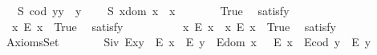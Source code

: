 \begin{isabellebody}
\ \ \ S{}{\isacharcolon}\ {\isachardoublequoteopen}{\isacharparenleft}cod\ y{\isacharparenright}{\isasymcdot}y\ {\isasymcong}\ y{\isachardoublequoteclose}\ \isanewline
\ \ \ S{}{\isacharcolon}\ {\isachardoublequoteopen}x{\isasymcdot}{\isacharparenleft}dom\ x{\isacharparenright}\ {\isasymcong}\ x{\isachardoublequoteclose}\isanewline
\ \ \isanewline
\ \ \ \isamarkupfalse%
\ True\ \isamarkupfalse%
\ {\isacharbrackleft}satisfy{\isacharbrackright}%
\isadelimproof
\ %
\endisadelimproof
%
\isatagproof
{}\isamarkupfalse%
\ \ %
%
\endisatagproof
{\isafoldproof}%
%
\isadelimproof
%
\endisadelimproof
\isanewline
\ \ \ \isamarkupfalse%
\ \ {\isachardoublequoteopen}{\isasymexists}x{\isachardot}\ \isactrlbold {\isasymnot}{\isacharparenleft}E\ x{\isacharparenright}{\isachardoublequoteclose}\ \ True\ \isamarkupfalse%
\ {\isacharbrackleft}satisfy{\isacharbrackright}%
\isadelimproof
\ %
\endisadelimproof
%
\isatagproof
{}\isamarkupfalse%
\ \ %
%
\endisatagproof
{\isafoldproof}%
%
\isadelimproof
%
\endisadelimproof
\isanewline
\ \ \ \isamarkupfalse%
\ \ {\isachardoublequoteopen}{\isacharparenleft}{\isasymexists}x{\isachardot}\ \isactrlbold {\isasymnot}{\isacharparenleft}E\ x{\isacharparenright}{\isacharparenright}\ {\isasymand}\ {\isacharparenleft}{\isasymexists}x{\isachardot}\ {\isacharparenleft}E\ x{\isacharparenright}{\isacharparenright}{\isachardoublequoteclose}\ \ True\ \isamarkupfalse%
\ {\isacharbrackleft}satisfy{\isacharbrackright}%
\isadelimproof
\ %
\endisadelimproof
%
\isatagproof
{}\isamarkupfalse%
\ \ %
%
\endisatagproof
{\isafoldproof}%
%
\isadelimproof
%
\endisadelimproof
\isanewline
\ \ \isamarkupfalse%
%
\isamarkuptrue%
\ \isamarkupfalse%
\ AxiomsSet{}\isanewline
\ \ \isanewline
\ \ \ \isamarkupfalse%
\ S\isactrlsub i\isactrlsub v{\isacharcolon}\ {\isachardoublequoteopen}{\isacharparenleft}E{\isacharparenleft}x{\isasymcdot}y{\isacharparenright}\ \isactrlbold {\isasymrightarrow}\ {\isacharparenleft}E\ x\ \isactrlbold {\isasymand}\ E\ y{\isacharparenright}{\isacharparenright}\ \isactrlbold {\isasymand}\ {\isacharparenleft}E{\isacharparenleft}dom\ x\ {\isacharparenright}\ \isactrlbold {\isasymrightarrow}\ E\ x{\isacharparenright}\ \isactrlbold {\isasymand}\ {\isacharparenleft}E{\isacharparenleft}cod\ y{\isacharparenright}\ \isactrlbold {\isasymrightarrow}\ E\ y{\isacharparenright}{\isachardoublequoteclose}%

\end{isabellebody}

